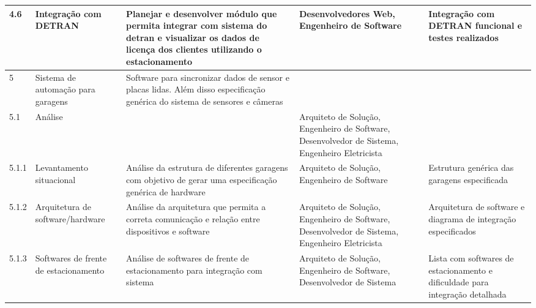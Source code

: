 \begin{landscape}
\begin{longtable}{@{\extracolsep{\fill}}  l  p{}  p{}  p{}  p{}  }
	\midrule
	4.6         & Integração com DETRAN                                   & Planejar e desenvolver módulo que permita integrar com sistema do detran e visualizar os dados de licença dos clientes utilizando o estacionamento                             & Desenvolvedores Web, Engenheiro de Software                                                      & Integração com DETRAN funcional e testes realizados                                                    \\*
	\midrule
	5           & Sistema de automação para garagens                      & Software para sincronizar dados de sensor e placas lidas. Além disso especificação genérica do sistema de sensores e câmeras                                                &                                                                                                  &                                                                                                          \\*
	\midrule
	5.1         & Análise                                                  &                                                                                                                                                                                  & Arquiteto de Solução, Engenheiro de Software, Desenvolvedor de Sistema, Engenheiro Eletricista &                                                                                                          \\*
	\midrule
	5.1.1       & Levantamento situacional                                  & Análise da estrutura de diferentes garagens com objetivo de gerar uma especificação genérica de hardware                                                                     & Arquiteto de Solução, Engenheiro de Software                                                   & Estrutura genérica das garagens especificada                                                            \\*
	\midrule
	5.1.2       & Arquitetura de software/hardware                          & Análise da arquitetura que permita a correta comunicação e relação entre dispositivos e software                                                                            & Arquiteto de Solução, Engenheiro de Software, Desenvolvedor de Sistema, Engenheiro Eletricista & Arquitetura de software e diagrama de integração especificados                                         \\*
	\midrule
	5.1.3       & Softwares de frente de estacionamento                     & Análise de softwares de frente de estacionamento para integração com sistema                                                                                                  & Arquiteto de Solução, Engenheiro de Software, Desenvolvedor de Sistema                         & Lista com softwares de estacionamento e dificuldade para integração detalhada                          \\*

\end{longtable}
\end{landscape}
